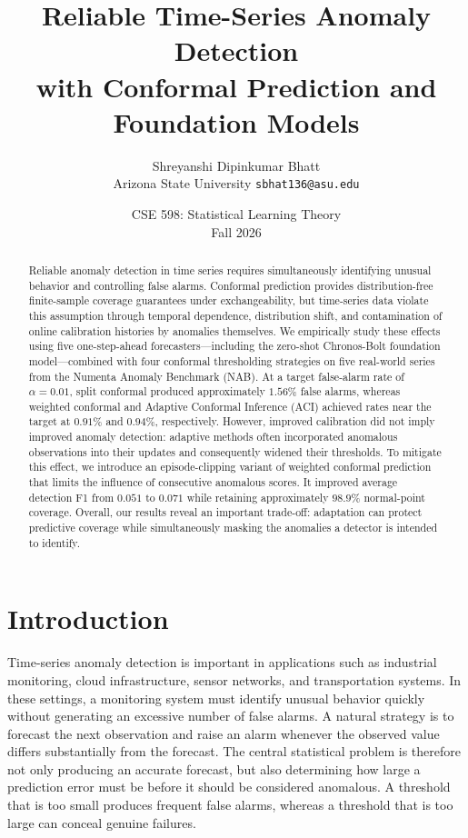 \documentclass[11pt]{article}
\title{Reliable Time-Series Anomaly Detection\\with Conformal Prediction and Foundation Models}
\author{
  Shreyanshi Dipinkumar Bhatt\\
  \small Arizona State University \quad \texttt{sbhat136@asu.edu}
}
\date{CSE 598: Statistical Learning Theory \\ Fall 2026}
\theoremstyle{definition}
\theoremstyle{remark}
\begin{document}
\maketitle

\begin{abstract}
Reliable anomaly detection in time series requires simultaneously identifying unusual behavior and controlling false alarms. Conformal prediction provides distribution-free finite-sample coverage guarantees under exchangeability, but time-series data violate this assumption through temporal dependence, distribution shift, and contamination of online calibration histories by anomalies themselves. We empirically study these effects using five one-step-ahead forecasters---including the zero-shot Chronos-Bolt foundation model---combined with four conformal thresholding strategies on five real-world series from the Numenta Anomaly Benchmark (NAB). At a target false-alarm rate of $\alpha=0.01$, split conformal produced approximately $1.56\%$ false alarms, whereas weighted conformal and Adaptive Conformal Inference (ACI) achieved rates near the target at $0.91\%$ and $0.94\%$, respectively. However, improved calibration did not imply improved anomaly detection: adaptive methods often incorporated anomalous observations into their updates and consequently widened their thresholds. To mitigate this effect, we introduce an episode-clipping variant of weighted conformal prediction that limits the influence of consecutive anomalous scores. It improved average detection F1 from $0.051$ to $0.071$ while retaining approximately $98.9\%$ normal-point coverage. Overall, our results reveal an important trade-off: adaptation can protect predictive coverage while simultaneously masking the anomalies a detector is intended to identify.
\end{abstract}

\section{Introduction}\label{sec:intro}

Time-series anomaly detection is important in applications such as industrial monitoring, cloud infrastructure, sensor networks, and transportation systems. In these settings, a monitoring system must identify unusual behavior quickly without generating an excessive number of false alarms. A natural strategy is to forecast the next observation and raise an alarm whenever the observed value differs substantially from the forecast. The central statistical problem is therefore not only producing an accurate forecast, but also determining how large a prediction error must be before it should be considered anomalous. A threshold that is too small produces frequent false alarms, whereas a threshold that is too large can conceal genuine failures.
\end{document}

